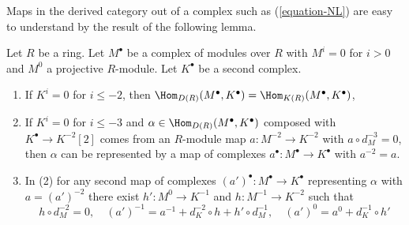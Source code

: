 \noindent
Maps in the derived category out of a complex such as (\ref{equation-NL})
are easy to understand by the result of the following lemma.

\begin{lemma}
\label{lemma-map-out-of-almost-free}
Let $R$ be a ring. Let $M^\bullet$ be a complex of modules over $R$
with $M^i = 0$ for $i > 0$ and $M^0$ a projective $R$-module.
Let $K^\bullet$ be a second complex.
\begin{enumerate}
\item If $K^i = 0$ for $i \leq -2$, then
$\Hom_{D(R)}(M^\bullet, K^\bullet) = \Hom_{K(R)}(M^\bullet, K^\bullet)$,
\item If $K^i = 0$ for $i \leq -3$ and
$\alpha \in \Hom_{D(R)}(M^\bullet, K^\bullet)$ composed with
$K^\bullet \to K^{-2}[2]$ comes from an $R$-module map
$a : M^{-2} \to K^{-2}$ with $a \circ d_M^{-3} = 0$, then
$\alpha$ can be represented by a map of complexes
$a^\bullet : M^\bullet \to K^\bullet$ with $a^{-2} = a$.
\item In (2) for any second map of complexes
$(a')^\bullet : M^\bullet \to K^\bullet$
representing $\alpha$ with $a = (a')^{-2}$
there exist $h' : M^0 \to K^{-1}$ and
$h : M^{-1} \to K^{-2}$ such that
$$
h \circ d_M^{-2} = 0, \quad
(a')^{-1} = a^{-1} + d_K^{-2} \circ h + h' \circ d_M^{-1},\quad
(a')^0 = a^0 + d_K^{-1} \circ h'
$$
\end{enumerate}
\end{lemma}

